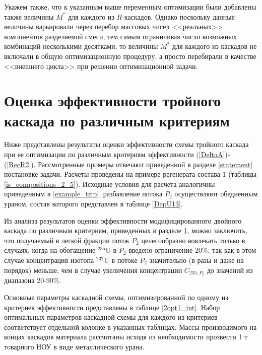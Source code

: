 Укажем также, что к указанным выше переменным оптимизации были добавлены также величины $M^{*}$ для каждого из $R$-каскадов. Однако поскольку данные величины варьировали через перебор массовых чисел <<реальных>> компонентов разделяемой смеси, тем самым ограничивая число возможных комбинаций несколькими десятками, то величины  $M^{*}$ для каждого из каскадов не включали в общую оптимизационную процедуру, а просто перебирали в качестве <<внешнего цикла>> при решении оптимизационной задачи.

\section{Оценка эффективности тройного каскада по различным критериям}\label{MDKefficiency}

Ниже представлены результаты оценки эффективности схемы тройного каскада при ее оптимизации по различным критериям эффективности (\ref{DeltaA})-(\ref{RecR2}). Рассмотренные примеры отвечают приведенной в разделе \ref{statement} постановке задачи. Расчеты проведены на примере регенерата состава 1  (таблицы \ref{is_compositions_2_5}). Исходные условия для расчета аналогичны приведенным в \ref{example_trip}, разбавление потока $P_2$ осуществляют обедненным ураном, состав которого представлен в таблице \ref{DepU13}.

Из анализа результатов оценки эффективности модифицированного двойного каскада по различным критериям, приведенных в разделе \ref{MDKefficiency}, можно заключить, что получаемый в легкой фракции поток $P_2$ целесообразно вовлекать только в случаях, когда на обогащение $^{235}$U в $P_2$ введено ограничение 20\%, так как в этом случае концентрация изотопа $^{232}$U в потоке $P_2$ значительно (в разы и даже на порядок) меньше, чем в случае увеличения концентрации $C_{235,{P_2}}$ до значений из диапазона 20-90\%.

Основные параметры каскадной схемы, оптимизированной по одному из критериев эффективности представлены в таблице \ref{2opt1_int}.
Набор оптимальных параметров каскадной схемы для каждого из критериев соответствует отдельной колонке в указанных таблицах. 
Массы производимого на концах каскадов материала рассчитаны исходя из необходимости прозвести 1 т товарного НОУ в виде металлического урана.

